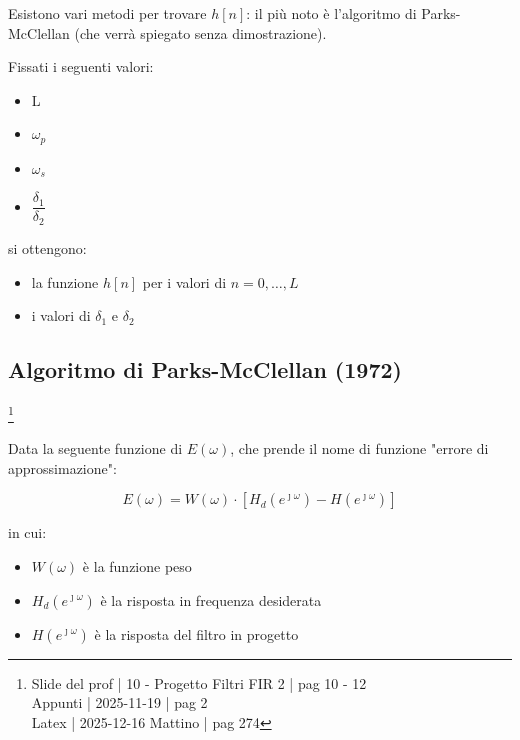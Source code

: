 Esistono vari metodi per trovare $h \left[ n\right]$: il più noto è l'algoritmo di Parks-McClellan (che verrà spiegato senza dimostrazione). \newline 

Fissati i seguenti valori: 

\begin{itemize}
    \item L 
    \item $\omega_p$ 
    \item $\omega_s$ 
    \item $\dfrac{\delta_1}{\delta_2}$
\end{itemize}

si ottengono: 

\begin{itemize}
    \item la funzione $h \left[ n\right]$ per i valori di $n = 0, \dots, L$ 
    \item i valori di $\delta_1$ e $\delta_2$
\end{itemize}

\newpage 

\subsection{Algoritmo di Parks-McClellan (1972)}

\footnote{ 
    Slide del prof | 10 - Progetto Filtri FIR 2 | pag 10 - 12\\
    Appunti | 2025-11-19 | pag 2 \\ 
    Latex | 2025-12-16 Mattino | pag 274  
}

Data la seguente funzione di $E \left(\omega\right)$, che prende il nome di funzione "errore di approssimazione": 

{
    \Large 
    \begin{equation}
        E \left(\omega\right) 
        = 
        W \left( \omega\right) 
        \cdot 
        \left[ 
            H_d \left(e^{\jmath \omega}\right) 
            - 
            H \left(e^{\jmath \omega}\right) 
        \right]
    \end{equation}
}

in cui: 

\begin{itemize}
    \item $W \left(\omega\right)$ è la funzione peso 
    \item $H_d \left(e^{\jmath \omega}\right)$ è la risposta in frequenza desiderata 
    \item $H \left(e^{\jmath \omega}\right)$ è la risposta del filtro in progetto 
\end{itemize}

